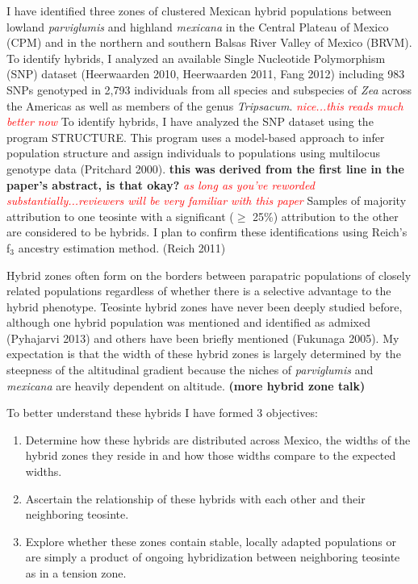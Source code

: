 \documentclass[12pt]{amsart}
\newcommand{\mbh}[1]{\textcolor{red}{ \emph{\scriptsize  #1}} }
\begin{document}
I have identified three zones of clustered Mexican hybrid populations between lowland \textit{parviglumis} and highland \textit{mexicana} in the Central Plateau of Mexico (CPM) and in the northern and southern Balsas River Valley of Mexico (BRVM). 
To identify hybrids, I analyzed an available Single Nucleotide Polymorphism (SNP) dataset  (Heerwaarden 2010, Heerwaarden 2011, Fang 2012) including 983 SNPs genotyped in 2,793 individuals from all species and subspecies of \textit{Zea} across the Americas as well as members of the genus \textit{Tripsacum}.  \mbh{nice...this reads much better now}
To identify hybrids, I have analyzed the SNP dataset using the program STRUCTURE.
This program uses a model-based approach to infer population structure and assign individuals to populations using multilocus genotype data (Pritchard 2000). \textbf{this was derived from the first line in the paper's abstract, is that okay?} \mbh{as long as you've reworded substantially...reviewers will be very familiar with this paper}
Samples of majority attribution to one teosinte with a significant ($\geq$ 25\%) attribution to the other are considered to be hybrids.
I plan to confirm these identifications using Reich's f$_{\text{3}}$ ancestry estimation method. (Reich  2011)%


Hybrid zones often form on the borders between parapatric populations of closely related populations regardless of whether there is a selective advantage to the hybrid phenotype.
Teosinte hybrid zones have never been deeply studied before, although one hybrid population was mentioned and identified as admixed (Pyhajarvi 2013)  and others have been briefly mentioned (Fukunaga 2005).
My expectation is that the width of these hybrid zones is largely determined by the steepness of the altitudinal gradient because the niches of \textit{parviglumis} and \textit{mexicana} are heavily dependent on altitude.
 \textbf{(more hybrid zone talk)} 


To better understand these hybrids I have formed 3 objectives: 
\begin{enumerate} 
	\item Determine how these hybrids are distributed across Mexico, the widths of the hybrid zones they reside in and how those widths compare to the expected widths.
	\item Ascertain the relationship of these hybrids with each other and their neighboring teosinte.
	\item Explore whether these zones contain stable, locally adapted populations or are simply a product of ongoing hybridization between neighboring teosinte as in a tension zone.
\end{enumerate} 
\end{document}
